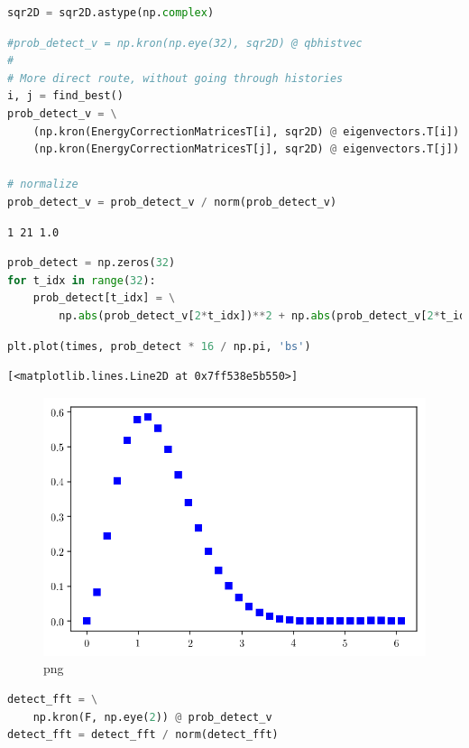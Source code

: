 \begin{lstlisting}[language=Python]
sqr2D = sqr2D.astype(np.complex)
\end{lstlisting}

\begin{lstlisting}[language=Python]
#prob_detect_v = np.kron(np.eye(32), sqr2D) @ qbhistvec
#
# More direct route, without going through histories
i, j = find_best()
prob_detect_v = \
    (np.kron(EnergyCorrectionMatricesT[i], sqr2D) @ eigenvectors.T[i]) + \
    (np.kron(EnergyCorrectionMatricesT[j], sqr2D) @ eigenvectors.T[j])

# normalize
prob_detect_v = prob_detect_v / norm(prob_detect_v)

\end{lstlisting}

\begin{lstlisting}
1 21 1.0
\end{lstlisting}

\begin{lstlisting}[language=Python]
prob_detect = np.zeros(32)
for t_idx in range(32):
    prob_detect[t_idx] = \
        np.abs(prob_detect_v[2*t_idx])**2 + np.abs(prob_detect_v[2*t_idx+1])**2
\end{lstlisting}

\begin{lstlisting}[language=Python]
plt.plot(times, prob_detect * 16 / np.pi, 'bs')
\end{lstlisting}

\begin{lstlisting}
[<matplotlib.lines.Line2D at 0x7ff538e5b550>]
\end{lstlisting}

\begin{figure}
\centering
\includegraphics[width=0.6\linewidth]{output_99_1.png}
\caption{png}
\end{figure}

\begin{lstlisting}[language=Python]
detect_fft = \
    np.kron(F, np.eye(2)) @ prob_detect_v
detect_fft = detect_fft / norm(detect_fft)
\end{lstlisting}

